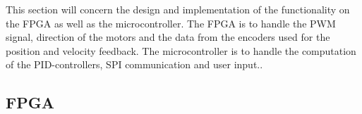 \documentclass[../../main.tex]{subfiles}
\begin{document}
This section will concern the design and implementation of the functionality on the FPGA as well as the microcontroller. The FPGA is to handle the PWM signal, direction of the motors and the data from the encoders used for the position and velocity feedback. The microcontroller is to handle the computation of the PID-controllers, SPI communication and user input.. 



\subsection{FPGA} \label{subsec:SystemImplemtationFPGA}



\end{document}
